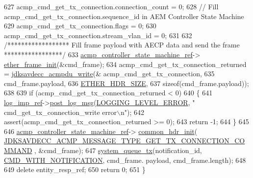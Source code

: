 \begin{DoxyCode}
627     acmp\_cmd\_get\_tx\_connection.connection\_count = 0;
628     \textcolor{comment}{// Fill acmp\_cmd\_get\_tx\_connection.sequence\_id in AEM Controller State Machine}
629     acmp\_cmd\_get\_tx\_connection.flags = 0;
630     acmp\_cmd\_get\_tx\_connection.stream\_vlan\_id = 0;
631 
632     \textcolor{comment}{/****************** Fill frame payload with AECP data and send the frame *****************/}
633     \hyperlink{namespaceavdecc__lib_a693c2049de1d4ec860a92126b846ac21}{acmp\_controller\_state\_machine\_ref}->
      \hyperlink{classavdecc__lib_1_1acmp__controller__state__machine_a0a43868a3e99a6cef740e4562d006345}{ether\_frame\_init}(&cmd\_frame);
634     acmp\_cmd\_get\_tx\_connection\_returned = \hyperlink{group__acmpdu_ga8cf8b61ba149419878384da1540d9673}{jdksavdecc\_acmpdu\_write}(&
      acmp\_cmd\_get\_tx\_connection,
635                                                                   cmd\_frame.payload,
636                                                                   \hyperlink{namespaceavdecc__lib_a6c827b1a0d973e18119c5e3da518e65ca9512ad9b34302ba7048d88197e0a2dc0}{ETHER\_HDR\_SIZE},
637                                                                   \textcolor{keyword}{sizeof}(cmd\_frame.payload));
638 
639     \textcolor{keywordflow}{if} (acmp\_cmd\_get\_tx\_connection\_returned < 0)
640     \{
641         \hyperlink{namespaceavdecc__lib_acbe3e2a96ae6524943ca532c87a28529}{log\_imp\_ref}->\hyperlink{classavdecc__lib_1_1log_a68139a6297697e4ccebf36ccfd02e44a}{post\_log\_msg}(\hyperlink{namespaceavdecc__lib_a501055c431e6872ef46f252ad13f85cdaf2c4481208273451a6f5c7bb9770ec8a}{LOGGING\_LEVEL\_ERROR}, \textcolor{stringliteral}{"
      cmd\_get\_tx\_connection\_write error\(\backslash\)n"});
642         assert(acmp\_cmd\_get\_tx\_connection\_returned >= 0);
643         \textcolor{keywordflow}{return} -1;
644     \}
645 
646     \hyperlink{namespaceavdecc__lib_a693c2049de1d4ec860a92126b846ac21}{acmp\_controller\_state\_machine\_ref}->
      \hyperlink{classavdecc__lib_1_1acmp__controller__state__machine_ae93a117baf9620a7311f950271610506}{common\_hdr\_init}(
      \hyperlink{group__acmp__message__type_ga3aa7da422958df4d1fa9ba84aa96a281}{JDKSAVDECC\_ACMP\_MESSAGE\_TYPE\_GET\_TX\_CONNECTION\_COMMAND}
      , &cmd\_frame);
647     \hyperlink{namespaceavdecc__lib_a6dd511685627c0865a3442b539a4e8e9}{system\_queue\_tx}(notification\_id, \hyperlink{namespaceavdecc__lib_aabcadff06aa62be0ce47bc0646823604aba48b8a017e06fb240b650cdea965178}{CMD\_WITH\_NOTIFICATION}, cmd\_frame.
      payload, cmd\_frame.length);
648 
649     \textcolor{keyword}{delete} entity\_resp\_ref;
650     \textcolor{keywordflow}{return} 0;
651 \}
\end{DoxyCode}



